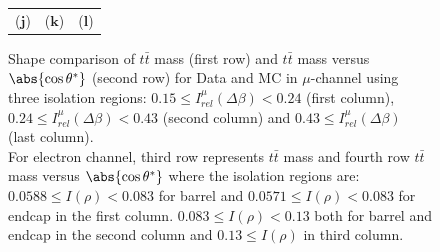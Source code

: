 \begin{figure}[htp]
\begin{tabular}{ccc}
   ($\mathbf{j}$)\qquad\qquad&($\mathbf{k}$)\qquad\qquad\qquad&($\mathbf{l}$)\qquad\qquad\qquad\\
\end{tabular}
\caption{Shape comparison of $t\bar{t}$ mass (first row) and $t\bar{t}$ mass versus $\abs{\cos\theta^*}$ (second row) for Data and MC in $\mu$-channel using three isolation regions: $0.15 \leq I_{rel}^{\mu}(\Delta\beta) < 0.24$ (first column), $0.24 \leq I_{rel}^{\mu}(\Delta\beta) < 0.43$ (second column) and $0.43 \leq I_{rel}^{\mu}(\Delta\beta)$ (last column).\\
For electron channel, third row represents $t\bar{t}$ mass and fourth row $t\bar{t}$ mass versus $\abs{\cos\theta^*}$ where the isolation regions are: $0.0588 \leq I(\rho) < 0.083$ for barrel and $0.0571 \leq I(\rho) < 0.083$ for endcap in the first column. $0.083 \leq I(\rho) < 0.13$ both for barrel and endcap in the second column and $0.13 \leq I(\rho)$ in third column.}
\label{Fig:qcd_3region_shapes}
\end{figure}
